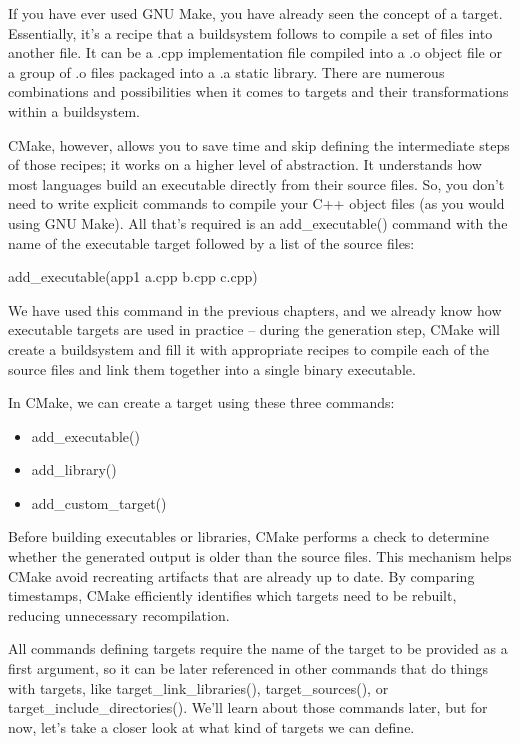 If you have ever used GNU Make, you have already seen the concept of a target. Essentially, it’s a recipe that a buildsystem follows to compile a set of files into another file. It can be a .cpp implementation file compiled into a .o object file or a group of .o files packaged into a .a static library. There are numerous combinations and possibilities when it comes to targets and their transformations within a buildsystem.

CMake, however, allows you to save time and skip defining the intermediate steps of those recipes; it works on a higher level of abstraction. It understands how most languages build an executable directly from their source files. So, you don’t need to write explicit commands to compile your C++ object files (as you would using GNU Make). All that’s required is an add\_executable() command with the name of the executable target followed by a list of the source files:

\begin{cmake}
add_executable(app1 a.cpp b.cpp c.cpp)
\end{cmake}

We have used this command in the previous chapters, and we already know how executable targets are used in practice – during the generation step, CMake will create a buildsystem and fill it with appropriate recipes to compile each of the source files and link them together into a single binary executable.

In CMake, we can create a target using these three commands:

\begin{itemize}
\item
add\_executable()

\item
add\_library()

\item
add\_custom\_target()
\end{itemize}

Before building executables or libraries, CMake performs a check to determine whether the generated output is older than the source files. This mechanism helps CMake avoid recreating artifacts that are already up to date. By comparing timestamps, CMake efficiently identifies which targets need to be rebuilt, reducing unnecessary recompilation.

All commands defining targets require the name of the target to be provided as a first argument, so it can be later referenced in other commands that do things with targets, like target\_link\_libraries(), target\_sources(), or target\_include\_directories(). We’ll learn about those commands later, but for now, let’s take a closer look at what kind of targets we can define.

